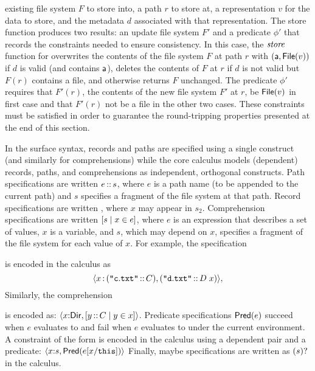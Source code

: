 existing file system $F$ to store into, a path $r$ to store at, a
representation $v$ for the data to store, and the metadata $d$ associated
with that representation.  The store function
produces two results: an update file system $F'$ and a predicate
$\phi'$ that records the constraints needed to ensure
consistency. In this case, the $\mathit{store}_{}$ function for \pfile{}
overwrites the contents of the file system $F$ at path $r$ with
$(\mathsf{a},\mathsf{File}(v))$ if $d$ is valid (and contains $\mathsf{a}$), deletes the
contents of $F$ at $r$ if $d$ is not valid but $F(r)$ contains a file,
and otherwise returns $F$ unchanged. The predicate $\phi'$ requires
that $F'(r)$, the contents of the new file system $F'$ at $r$, be
$\mathsf{File}(v)$ in first case and that $F'(r)$ not be a file in the other
two cases. These constraints must be satisfied in order to guarantee
the round-tripping properties presented at the end of this section.


In the \forest{} surface syntax, records and paths are specified using
a single construct (and similarly for comprehensions) while the core
calculus models (dependent) records, paths, and comprehensions as
independent, orthogonal constructs.  Path specifications are written
$e\,{::}\,s$, where $e$ is a path name (to be appended to the
current path) and $s$ specifies a fragment of the file system at that
path. Record specifications are written , where $x$
may appear in $s_2$. Comprehension specifications are written
$[ s \mid x \in e ]$, where $e$ is an expression that describes a set of
values, $x$ is a variable, and $s$, which may depend on $x$, specifies
a fragment of the file system for each value of $x$.  For example, the
specification
\begin{center}
\end{center}
is encoded in the calculus as
%
\[
\langle x\, {:} \,(\texttt{"}\mathtt{c.txt}\texttt{"}\,{::}\,C), (\texttt{"}\mathtt{d.txt}\texttt{"}\,{::}\,D\; x) \rangle, 
\]
Similarly, the comprehension
\begin{center}
\cd{[c :: C | c <- \kw{matches} (GL "*")]} 
\end{center}
is encoded as: \(\langle x {:} \mathsf{Dir}, [ y\,{::}\,C \mid y \in x ] \rangle
\). Predicate specifications $\mathsf{Pred}(e)$ succeed when $e$ evaluates to
\True{} and fail when $e$ evaluates to \False{} under the current
environment.  A \forest{} constraint of the form 
is encoded in the calculus using a dependent pair and a predicate:
$\langle x {:} s, \mathsf{Pred}(e[x/\mathtt{this}]) \rangle$ Finally, maybe
specifications are written as $(s)?$ in the calculus.

